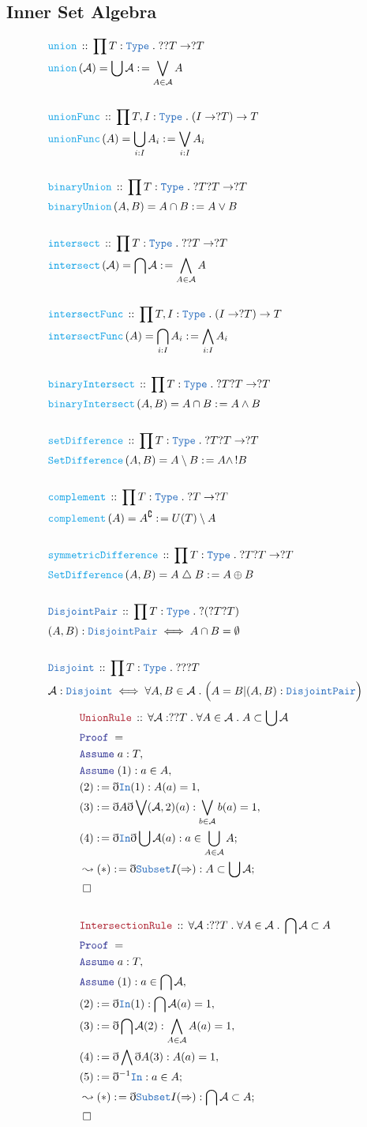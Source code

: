 \documentclass[12pt]{scrartcl}
\newcommand{\TYPE}[1]{\textcolor{NavyBlue}{\mathtt{#1}}}
\newcommand{\FUNC}[1]{\textcolor{Cerulean}{\mathtt{#1}}}
\newcommand{\LOGIC}[1]{\textcolor{Blue}{\mathtt{#1}}}
\newcommand{\THM}[1]{\textcolor{Maroon}{\mathtt{#1}}}
\renewcommand{\.}{\; . \;}
\newcommand{\de}{: \kern 0.1pc =}
\newcommand{\Act}[1]{\left( #1 \right)}
\newcommand{\Theorem}[2]{& \THM{#1} \, :: \, #2 \\ & \Proof = \\ }
\newcommand{\DeclareType}[2]{& \TYPE{#1} \, :: \, #2 \\}
\newcommand{\DefineType}[3]{& #1 : \TYPE{#2} \iff #3 \\}
\newcommand{\DeclareFunc}[2]{& \FUNC{#1} \, :: \, #2 \\}
\newcommand{\DefineNamedFunc}[4]{&  \FUNC{#1}\Act{#2} = #3 \de #4 \\}
\newcommand{\Page}[1]{ \begin{align*} #1 \end{align*}   }
\newcommand{ \bd }{ \ByDef }
\newcommand{\Type}{\TYPE{Type}}
\newcommand{\du}{\; \triangle \;}
\renewcommand{\c}{\complement}
\newcommand{\Say}[3]{& #1 \de #2 : #3, \\}
\newcommand{\Conclude}[3]{& #1 \de #2 : #3; \\}
\newcommand{\DeriveConclude}[3]{& \leadsto #1 \de #2 : #3 ; \\}
\newcommand{\A}{\LOGIC{Assume} \;}
\newcommand{\Assume}[2]{& \A #1 : #2, \\}
\newcommand{\QED}{\; \square}
\newcommand{\EndProof}{& \QED \\}
\newcommand{\ByDef}{\eth}
\newcommand{\Proof}{\LOGIC{Proof} \; }
\begin{document}
\subsection{Inner Set Algebra}
\Page{
	\DeclareFunc{union}{ \prod T : \Type\. ??T \to ?T }
	\DefineNamedFunc{union}{\mathcal{A}}{\bigcup \mathcal{A}}{ \bigvee_{A \in \mathcal{A}}A  }
	\\
	\DeclareFunc{unionFunc}{\prod T,I : \Type\. (I \to ?T) \to T}
	\DefineNamedFunc{unionFunc}{A}{ \bigcup_{i : I} A_i   }{\bigvee_{i : I} A_i}
	\\
	\DeclareFunc{binaryUnion}{\prod T : \Type \.  ?T?T \to ?T}
	\DefineNamedFunc{binaryUnion}{A,B}{A \cap B}{ A \vee B  }
	\\
	\DeclareFunc{intersect}{ \prod T : \Type\. ??T \to ?T }
	\DefineNamedFunc{intersect}{\mathcal{A}}{\bigcap \mathcal{A}}
	{ \bigwedge_{A \in \mathcal{A}}A  }
	\\
	\DeclareFunc{intersectFunc}{\prod T,I : \Type\. (I \to ?T) \to T}
	\DefineNamedFunc{intersectFunc}{A}{ \bigcap_{i : I} A_i   }{\bigwedge_{i : I} A_i}
	\\
	\DeclareFunc{binaryIntersect}{\prod T : \Type \.  ?T?T \to ?T}
	\DefineNamedFunc{binaryIntersect}{A,B}{A \cap B}{ A \wedge B  }
	\\
	\DeclareFunc{setDifference}{\prod T : \Type \. ?T?T \to ?T}
	\DefineNamedFunc{SetDifference}{A,B}{A \setminus B}{A \wedge \, ! B  }
	\\
	\DeclareFunc{complement}{\prod T : \Type \. ?T \to ?T}
	\DefineNamedFunc{complement}{A}{A^\c}{ U(T) \setminus A  }
	\\
	\DeclareFunc{symmetricDifference}{ \prod T : \Type \. ?T?T \to ?T     }
	\DefineNamedFunc{SetDifference}{A,B}{A \du B}{ A \oplus B  }
	\\
	\DeclareType{DisjointPair}{ \prod T : \Type \. ?(?T?T)  }
	\DefineType{(A,B)}{DisjointPair}{ A \cap B = \emptyset}
	\\
	\DeclareType{Disjoint}{ \prod T : \Type \. ???T}
	\DefineType{\mathcal{A}}{Disjoint}
	{ \forall A,B \in \mathcal{A} \. \Big( A = B | (A,B) : \TYPE{DisjointPair} \Big) }
}
\Page{
	\Theorem{UnionRule}{\forall \mathcal{A} : ??T \. \forall A \in \mathcal{A} \. 
		A \subset \bigcup \mathcal{A}}
	\Assume{a}{T}
	\Assume{(1)}{a \in A}
	\Say{(2)}{\bd \TYPE{In}(1)}{A(a) = 1}
	\Say{(3)}{ \bd A \bd  \bigvee (\mathcal{A},2)(a) }
	{ \bigvee_{b \in \mathcal{A}} b(a) = 1   }
	\Conclude{(4)}{ \bd \TYPE{In} \bd \bigcup \mathcal{A} (a) }
	{a \in \bigcup_{A \in \mathcal{A}} A}
	\DeriveConclude{(*)}{ \bd \TYPE{Subset}I(\Rightarrow)}{ A \subset \bigcup \mathcal{A}}
	\EndProof
	\\
	\Theorem{IntersectionRule}{\forall \mathcal{A} : ??T \. \forall A \in \mathcal{A} \. 
		\bigcap \mathcal{A} \subset A }
	\Assume{a}{T}
	\Assume{(1)}{a \in \bigcap \mathcal{A}}
	\Say{(2)}{\bd \TYPE{In}(1)}{\bigcap \mathcal{A}(a)  = 1  }
	\Say{(3)}{\bd \bigcap \mathcal{A}(2) }{ \bigwedge_{A \in \mathcal{A}} A(a) = 1  }
	\Say{(4)}{\bd \bigwedge \bd A (3) }{A(a) = 1}
	\Conclude{(5)}{\bd^{-1} \TYPE{In}}{a \in A}
	\DeriveConclude{(*)}{\bd \TYPE{Subset}I(\Rightarrow)}{ \bigcap \mathcal{A} \subset A}
	\EndProof	
}
\end{document}
